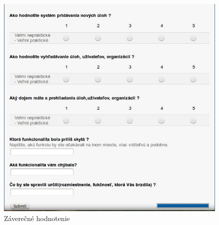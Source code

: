 {{\begin{figure}[htb]
\begin{center}
\end{center}

\end{figure}

\begin{figure}[htb]

\begin{center}

\includegraphics[scale=0.5]{dotaz3.jpg} 
\caption{Záverečné hodnotenie}


\end{center}

\end{figure}

	}


	


}

